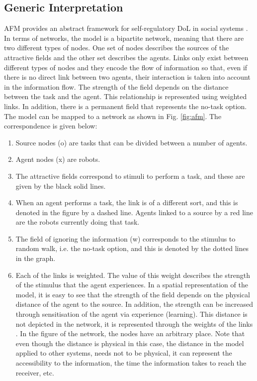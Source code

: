 \documentclass{llncs}
\begin{document}
\subsection{Generic Interpretation}
AFM provides an abstract framework for self-regulatory DoL in social systems \cite{Elsa}. In terms of networks, the model is a bipartite network, meaning that there are two different types of nodes. One set of nodes describes the sources of the attractive fields and the other set describes the agents. Links only exist between different types of nodes and they encode the flow of information so that, even if there is no direct link between two agents, their interaction is taken into account in the information flow. The strength of the field depends on the distance between the task and the agent.  This relationship is represented using weighted links. In addition, there is a permanent field that represents the no-task option. The model can be mapped to a network as shown in Fig. \ref{fig:afm}. The correspondence is given below:
\begin{enumerate}
\item Source nodes (o) are tasks that can be divided between a number of agents.
\item Agent nodes (x) are robots.
\item The attractive fields correspond to stimuli to perform a task, and these are given by the black solid lines.
\item When an agent performs a task, the link is of a different sort, and this is denoted in the figure by a dashed line. Agents linked to a source by a red line are the robots currently doing that task. 
\item The field of ignoring the information (w) corresponds to the stimulus to random walk, i.e. the no-task option, and this is denoted by the dotted lines in the graph. 
\item Each of the links is weighted. The value of this weight describes the strength of the stimulus that the agent experiences. In a spatial representation of the model, it is easy to see that the strength of the field depends on the physical distance of the agent to the source. In addition, the strength can be increased through sensitisation of the agent via experience (learning). This distance is not depicted in the network, it is represented through the weights of the links . In the figure of the network, the nodes have an arbitrary place. Note that even though the distance is physical in this case, the distance in the model applied to other systems, needs not to be physical, it can represent the accessibility to the information, the time the information takes to reach the receiver, etc. 
\end{enumerate}
\end{document}
